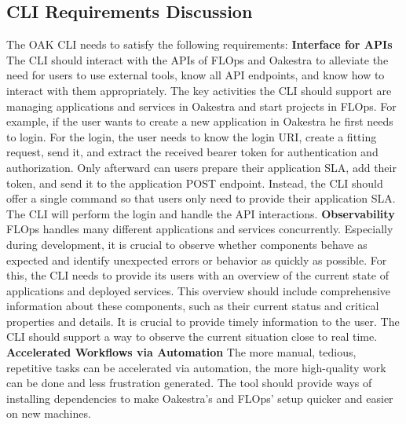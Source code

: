\subsection{CLI Requirements Discussion}

The OAK CLI needs to satisfy the following requirements:
\vspace{5mm}
\newline
\textbf{Interface for APIs}\newline
The CLI should interact with the APIs of FLOps and Oakestra to alleviate the need for users to use external tools, know all API endpoints, and know how to interact with them appropriately.
The key activities the CLI should support are managing applications and services in Oakestra and start projects in FLOps.
For example, if the user wants to create a new application in Oakestra he first needs to login.
For the login, the user needs to know the login URI, create a fitting request, send it, and extract the received bearer token for authentication and authorization.
Only afterward can users prepare their application SLA, add their token, and send it to the application POST endpoint.
Instead, the CLI should offer a single command so that users only need to provide their application SLA. 
The CLI will perform the login and handle the API interactions.
\vspace{5mm}
\newline
\textbf{Observability}\newline
FLOps handles many different applications and services concurrently.
Especially during development, it is crucial to observe whether components behave as expected and identify unexpected errors or behavior as quickly as possible.
For this, the CLI needs to provide its users with an overview of the current state of applications and deployed services.
This overview should include comprehensive information about these components, such as their current status and critical properties and details.
It is crucial to provide timely information to the user.
The CLI should support a way to observe the current situation close to real time.
\vspace{5mm}
\newline
\textbf{Accelerated Workflows via Automation}\newline
The more manual, tedious, repetitive tasks can be accelerated via automation, the more high-quality work can be done and less frustration generated.
The tool should provide ways of installing dependencies to make Oakestra's and FLOps' setup quicker and easier on new machines.
